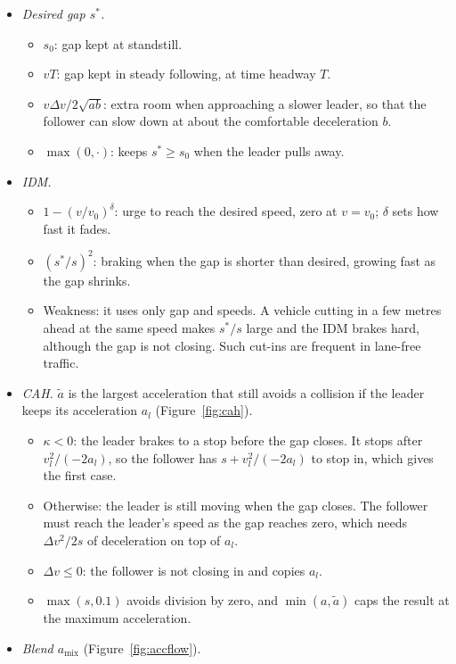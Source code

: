 \documentclass[11pt]{article}
\begin{document}
\begin{itemize}
\item \emph{Desired gap $s^*$.}
\begin{itemize}
\item $s_0$: gap kept at standstill.
\item $vT$: gap kept in steady following, at time headway $T$.
\item $v\Delta v/2\sqrt{ab}$: extra room when approaching a slower leader, so
that the follower can slow down at about the comfortable deceleration $b$.
\item $\max(0,\cdot)$: keeps $s^*\ge s_0$ when the leader pulls away.
\end{itemize}
\item \emph{IDM.}
\begin{itemize}
\item $1-(v/v_0)^\delta$: urge to reach the desired speed, zero at $v=v_0$;
$\delta$ sets how fast it fades.
\item $(s^*/s)^2$: braking when the gap is shorter than desired, growing fast as
the gap shrinks.
\item Weakness: it uses only gap and speeds. A vehicle cutting in a few metres
ahead at the same speed makes $s^*/s$ large and the IDM brakes hard, although
the gap is not closing. Such cut-ins are frequent in lane-free traffic.
\end{itemize}
\item \emph{CAH.} $\tilde a$ is the largest acceleration that still avoids a
collision if the leader keeps its acceleration $a_l$
(Figure~\ref{fig:cah}).
\begin{itemize}
\item $\kappa<0$: the leader brakes to a stop before the gap closes. It stops
after $v_l^2/(-2a_l)$, so the follower has $s+v_l^2/(-2a_l)$ to stop in, which
gives the first case.
\item Otherwise: the leader is still moving when the gap closes. The follower
must reach the leader's speed as the gap reaches zero, which needs
$\Delta v^2/2s$ of deceleration on top of $a_l$.
\item $\Delta v\le0$: the follower is not closing in and copies $a_l$.
\item $\max(s,0.1)$ avoids division by zero, and $\min(a,\tilde a)$ caps the
result at the maximum acceleration.
\end{itemize}
\item \emph{Blend $a_{\mathrm{mix}}$} (Figure~\ref{fig:accflow}).
\begin{itemize}

\end{itemize}
\end{itemize}
\end{document}
